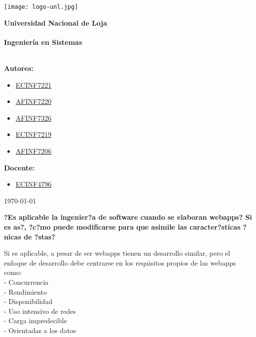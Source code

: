 \documentclass[6pt]{report}
\begin{document}
\centering
\newcommand{\titulo}{ Universidad Nacional de Loja \\ \ \\ Ingeniería en Sistemas \\ \ \\}
\newcommand{\fecha}{\today}




\pagestyle{empty}


\begin{center}\texttt{[image: logo-unl.jpg]}\end{center}


\Huge\bf\titulo
\raggedright\textbf{Autores:}
\begin{itemize}
\item \href{http://www.iralis.org/?q=node%2F10&paso=10&letra=&id=7221}{ECINF7221}
\item \href{http://www.iralis.org/?q=node%2F10&paso=10&letra=&id=7220}{AFINF7220}
\item \href{http://www.iralis.org/?q=node%2F10&paso=10&letra=B&id=7326}{AFINF7326}
\item \href{http://www.iralis.org/?q=node%2F10&paso=10&letra=E&id=7219}{ECINF7219}
\item \href{http://www.iralis.org/?q=node%2F10&paso=10&letra=G&id=7206}{AFINF7206}
\end{itemize}
\raggedright\textbf{Docente:\\}
\begin{itemize}
\item \href{http://www.iralis.org/?q=node%2F10&paso=10&letra=O&id=4796}{ECINF4796}
\end{itemize} 

\flushleft
\Large\rm\fecha

\newpage



\textbf{?Es aplicable la ingenier?a de software cuando se elaboran webapps? Si es as?, ?c?mo puede modificarse para que asimile las caracter?sticas ?nicas de ?stas?}

Si es aplicable, a pesar de ser webapps tienen un desarrollo similar, pero el enfoque de desarrollo debe centrarse en los requisitos propios de las webapps como:\\
- Concurrencia \\ 
- Rendimiento \\
- Disponibilidad \\
- Uso intensivo de redes \\
- Carga impredecible \\
- Orientadas a los datos \\
\end{document}
